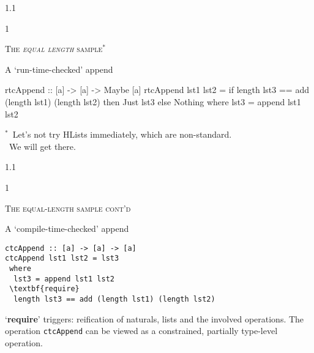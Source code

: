 \documentclass{slides}
\newcommand{\header}[1]{{\large\scshape \color{Red} #1} \medskip }
\newcommand{\blau}[1]{{\color{Blue} #1} \medskip }
\newenvironment{myslide}{\begin{slide}\color{Blue}\begin{boxedminipage}{1.1\hsize}\begin{boxedminipage}{1\hsize}\color{Black}
\vspace{-170\in}
}{%
\smallskip
\end{boxedminipage}
\end{boxedminipage}
\end{slide}}
\begin{document}
\begin{myslide}

\header{The \emph{equal length} sample$^*$}

\blau{A `run-time-checked' append}

{\tiny

\begin{code}
rtcAppend :: [a] -> [a] -> Maybe [a]
rtcAppend lst1 lst2
   = if length lst3 == add (length lst1) (length lst2)
        then Just lst3
        else Nothing
 where
  lst3 = append lst1 lst2
\end{code}

}

\bigskip

{\tiny

$^*$\ Let's not try HLists immediately, which are non-standard.\\
\phantom{$^*$}\ We will get there.

}

\end{myslide}






\begin{myslide}

\header{The equal-length sample cont'd}

\blau{A `compile-time-checked' append}

\begin{Verbatim}[fontseries=normal,fontsize=\small,commandchars=\\\{\}]
ctcAppend :: [a] -> [a] -> [a]
ctcAppend lst1 lst2 = lst3
 where
  lst3 = append lst1 lst2
 \textbf{require}
  length lst3 == add (length lst1) (length lst2) 
\end{Verbatim}

{\small

`\textbf{require}' triggers: reification of naturals, lists and the
involved operations. The operation \texttt{ctcAppend} can be
viewed as a constrained, partially type-level operation.

}

\end{myslide}



\end{document}

